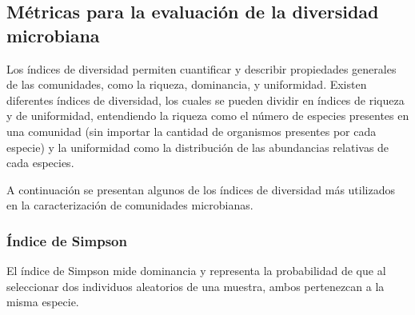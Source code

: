 


\subsection{Métricas para la evaluación de la diversidad microbiana}
Los índices de diversidad permiten cuantificar y describir propiedades generales de las comunidades, como la riqueza, dominancia, y uniformidad.  %
Existen diferentes índices de diversidad, los cuales se pueden dividir en índices de riqueza y de uniformidad, entendiendo la riqueza como el número de especies presentes en una comunidad (sin importar la cantidad de organismos presentes por cada especie) y la uniformidad como la distribución de las abundancias relativas de cada especies.

A continuación se presentan algunos de los índices de diversidad más utilizados en la caracterización de comunidades microbianas.   


\subsubsection{Índice de Simpson}
El índice de Simpson mide dominancia y representa la probabilidad de que al seleccionar dos individuos aleatorios de una muestra, ambos pertenezcan a la misma especie. 

